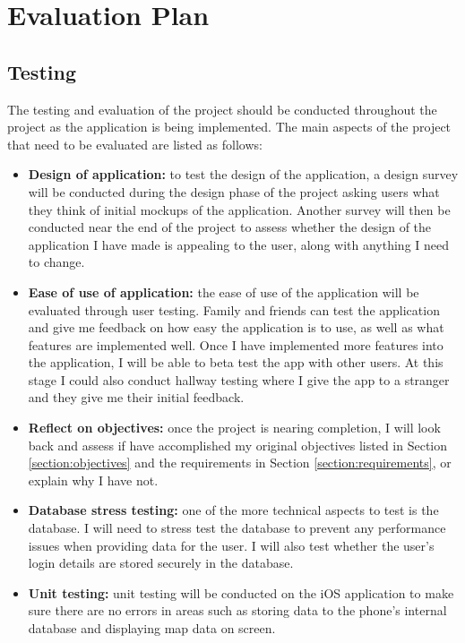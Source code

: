 \chapter{Evaluation Plan} \label{chapter:evaluation-plan}

\section{Testing}

The testing and evaluation of the project should be conducted throughout the project as the application is being implemented. The main aspects of the project that need to be evaluated are listed as follows:

\begin{itemize}
  \item \textbf{Design of application:} to test the design of the application, a design survey will be conducted during the design phase of the project asking users what they think of initial mockups of the application. Another survey will then be conducted near the end of the project to assess whether the design of the application I have made is appealing to the user, along with anything I need to change.
  \item \textbf{Ease of use of application:} the ease of use of the application will be evaluated through user testing. Family and friends can test the application and give me feedback on how easy the application is to use, as well as what features are implemented well. Once I have implemented more features into the application, I will be able to beta test the app with other users. At this stage I could also conduct hallway testing where I give the app to a stranger and they give me their initial feedback.
  \item \textbf{Reflect on objectives:} once the project is nearing completion, I will look back and assess if have accomplished my original objectives listed in Section \ref{section:objectives} and the requirements in Section \ref{section:requirements}, or explain why I have not.
  \item \textbf{Database stress testing:} one of the more technical aspects to test is the database. I will need to stress test the database to prevent any performance issues when providing data for the user. I will also test whether the user's login details are stored securely in the database.
  \item \textbf{Unit testing:} unit testing will be conducted on the iOS application to make sure there are no errors in areas such as storing data to the phone's internal database and displaying map data on screen.
\end{itemize}

